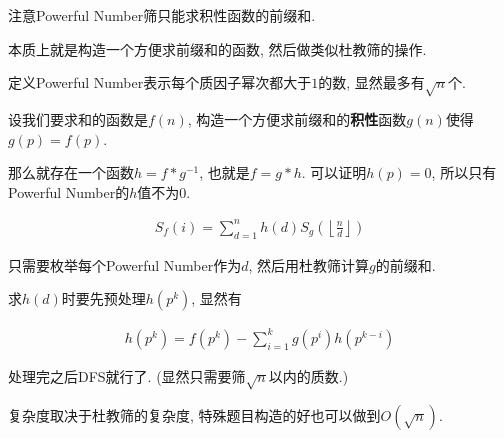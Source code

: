 注意Powerful Number筛只能求积性函数的前缀和.

本质上就是构造一个方便求前缀和的函数, 然后做类似杜教筛的操作.

定义Powerful Number表示每个质因子幂次都大于$1$的数, 显然最多有$\sqrt n$个.

设我们要求和的函数是$f(n)$, 构造一个方便求前缀和的\textbf{积性}函数$g(n)$使得$g(p) = f(p)$.

那么就存在一个函数$h = f * g ^ {-1}$, 也就是$f = g *h$. 可以证明$h(p) = 0$, 所以只有Powerful Number的$h$值不为0.

$$ \begin{aligned}
	S_f(i) = \sum_{d = 1} ^ n h(d) S_g \left( \left\lfloor \frac n d \right\rfloor \right)
\end{aligned} $$

只需要枚举每个Powerful Number作为$d$, 然后用杜教筛计算$g$的前缀和.

求$h(d)$时要先预处理$h(p^k)$, 显然有

$$ \begin{aligned}
	h \left(p ^ k \right) = f \left(p ^ k \right) - \sum_{i = 1} ^ k g \left( p ^ i \right) h \left( p ^ {k - i} \right)
\end{aligned} $$

处理完之后DFS就行了. (显然只需要筛$\sqrt n$以内的质数.)

复杂度取决于杜教筛的复杂度, 特殊题目构造的好也可以做到$O \left( \sqrt n \right)$.